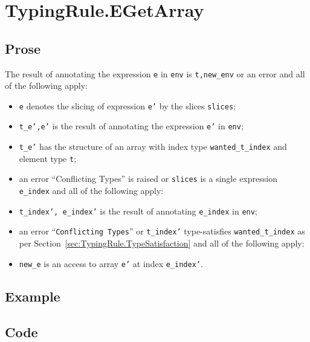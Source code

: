 \documentclass{book}
\begin{document}

\section{TypingRule.EGetArray \label{sec:TypingRule.EGetArray}}

  \subsection{Prose}
  The result of annotating the expression \texttt{e} in \texttt{env} is
\texttt{t,new\_env} or an error and all of the following apply:
  \begin{itemize}
  \item \texttt{e} denotes the slicing of expression \texttt{e'} by the slices \texttt{slices};
  \item \texttt{t\_e',e'} is the result of annotating the expression \texttt{e'} in \texttt{env};
  \item \texttt{t\_e'} has the structure of an array with index type \texttt{wanted\_t\_index} and element type \texttt{t};
  \item an error ``Conflicting Types'' is raised or \texttt{slices} is a single expression \texttt{e\_index} and all of the following apply:
  \item \texttt{t\_index', e\_index'} is the result of annotating \texttt{e\_index} in \texttt{env};
  \item an error ``\texttt{Conflicting Types}'' or \texttt{t\_index'} type-satisfies \texttt{wanted\_t\_index} as per Section~\ref{sec:TypingRule.TypeSatisfaction} and all of the following apply:
  \item \texttt{new\_e} is an access to array \texttt{e'} at index \texttt{e\_index'}.
  \end{itemize}

  \subsection{Example}

  \subsection{Code}
\end{document}

